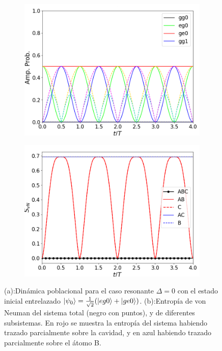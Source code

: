 \begin{figure}[h]
    \centering
    \begin{subfigure}{0.49\textwidth}
        \centering
        \includegraphics[width=\textwidth]{figuras/ch4/d eg0+ din ABC d=0.png}
        \caption{}
        \label{fig4:dinamica pob eg0 sim resonante}
    \end{subfigure}
    \hfill
    \begin{subfigure}{0.49\textwidth}
        \centering
        \includegraphics[width=\textwidth]{figuras/ch4/d eg0+ din svn d=0.png}
        \caption{}
        \label{fig4:dinamica svn eg0 sim resonante}
    \end{subfigure}
    \caption{(a):Dinámica poblacional para el caso resonante $\Delta=0$ con el estado inicial entrelazado $\ket{\psi_0}=\frac{1}{\sqrt{2}}(\ket{eg0} + \ket{ge0})$. (b):Entropía de von Neuman del sistema total (negro con puntos), y de diferentes subsistemas. En rojo se muestra la entropía del sistema habiendo trazado parcialmente sobre la cavidad, y en azul habiendo trazado parcialmente sobre el átomo B.}
    \label{fig4:dinamica eg0 sim resonante}
\end{figure}

